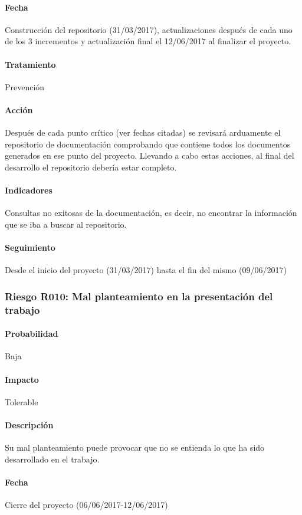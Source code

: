 \documentclass[10pt,a4paper]{article}
\begin{document}
				\paragraph{Fecha} Construcción del repositorio (31/03/2017), actualizaciones después de cada uno de los 3 incrementos y actualización final el 12/06/2017 al finalizar el proyecto.
				\paragraph{Tratamiento} Prevención
				\paragraph{Acción} Después de cada punto crítico (ver fechas citadas) se revisará arduamente el repositorio de documentación comprobando que contiene todos los documentos generados en ese punto del proyecto.	Llevando a cabo estas acciones, al final del desarrollo el repositorio debería estar completo.			
				\paragraph{Indicadores} Consultas no exitosas de la documentación, es decir, no encontrar la información que se iba a buscar al repositorio.
				\paragraph{Seguimiento}	Desde el inicio del proyecto (31/03/2017) hasta el fin del mismo (09/06/2017)
				
			\subsubsection{Riesgo R010: Mal planteamiento en la presentación del trabajo}
				\paragraph{Probabilidad} Baja
				\paragraph{Impacto}	Tolerable
				\paragraph{Descripción} Su mal planteamiento puede provocar que no se entienda lo que ha sido desarrollado en el trabajo. 
				\paragraph{Fecha} Cierre del proyecto (06/06/2017-12/06/2017)
\end{document}
